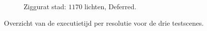 \begin{figure}[p]
\begin{adjustbox}{minipage=\textwidth, scale=0.6}
\begin{subfigure}[b]{0.83\textwidth}
      \label{fig:ts-resolution-forward:city}
    \end{subfigure}
  \end{adjustbox} %
  \begin{adjustbox}{minipage=\textwidth, scale=0.6}
    \begin{subfigure}[b]{0.83\textwidth}
      \centering
      \def\svgwidth{\textwidth}
      
      \caption{Ziggurat stad: $1170$ lichten, Deferred.}
      \label{fig:ts-resolution-deferred:city}
    \end{subfigure}
  \end{adjustbox}
  \caption{Overzicht van de executietijd per resolutie voor de drie testscenes.}
  \label{fig:ts-resolution}
\end{figure}

